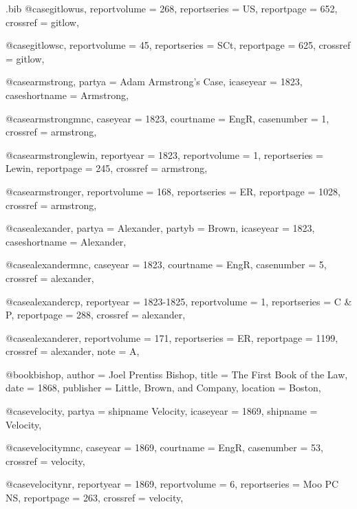 \begin{filecontents*}{\jobname.bib}
@case{gitlowus,
  reportvolume = {268},
  reportseries = {US},
  reportpage = {652},
  crossref = {gitlow},
}


@case{gitlowsc,
  reportvolume = {45},
  reportseries = {SCt},
  reportpage = {625},
  crossref = {gitlow},
}

@case{armstrong,
  partya = {Adam Armstrong's Case},
  icaseyear = {1823},
  caseshortname = {Armstrong},
	}

@case{armstrongmnc,
  caseyear = {1823},
  courtname = {EngR},
  casenumber = {1},
  crossref = {armstrong},
}


@case{armstronglewin,
  reportyear = {1823},
  reportvolume = {1},
  reportseries = {Lewin},
  reportpage = {245},
  crossref = {armstrong},
}

@case{armstronger,
  reportvolume = {168},
  reportseries = {ER},
  reportpage = {1028},
  crossref = {armstrong},
}




@case{alexander,
  partya = {Alexander},
  partyb = {Brown},
  icaseyear = {1823},
  caseshortname = {Alexander},
	}

@case{alexandermnc,
  caseyear = {1823},
  courtname = {EngR},
  casenumber = {5},
  crossref = {alexander},
}


@case{alexandercp,
  reportyear = {1823-1825},
  reportvolume = {1},
  reportseries = {C \& P},
  reportpage = {288},
  crossref = {alexander},
}

@case{alexanderer,
  reportvolume = {171},
  reportseries = {ER},
  reportpage = {1199},
  crossref = {alexander},
  note = {A},
}




@book{bishop,
author = {Joel Prentiss Bishop},
title = {The First Book of the Law},
date = {1868},
publisher = {Little, Brown, and Company},
location = {Boston},
}


@case{velocity,
  partya = {shipname Velocity},
  icaseyear = {1869},
  shipname = {Velocity},
	}

@case{velocitymnc,
  caseyear = {1869},
  courtname = {EngR},
  casenumber = {53},
  crossref = {velocity},
}


@case{velocitynr,
  reportyear = {1869},
  reportvolume = {6},
  reportseries = {Moo PC NS},
  reportpage = {263},
  crossref = {velocity},
}


\end{filecontents*}
